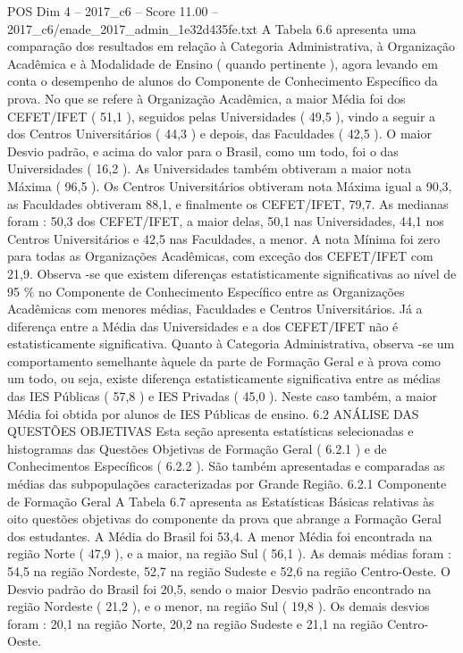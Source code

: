 \begin{textsample}{POS Dim 4 – 2017\_c6 – Score 11.00 – 2017\_c6/enade\_2017\_admin\_1e32d435fe.txt}
A Tabela 6.6 apresenta uma comparação dos resultados em relação à Categoria Administrativa, à Organização Acadêmica e à Modalidade de Ensino ( quando pertinente ), agora levando em conta o desempenho de alunos do Componente de Conhecimento Específico da prova.
No que se refere à Organização Acadêmica, a maior Média foi dos CEFET/IFET ( 51,1 ), seguidos pelas Universidades ( 49,5 ), vindo a seguir a dos Centros Universitários ( 44,3 ) e depois, das Faculdades ( 42,5 ).
O maior Desvio padrão, e acima do valor para o Brasil, como um todo, foi o das Universidades ( 16,2 ).
As Universidades também obtiveram a maior nota Máxima ( 96,5 ).
Os Centros Universitários obtiveram nota Máxima igual a 90,3, as Faculdades obtiveram 88,1, e finalmente os CEFET/IFET, 79,7.
As medianas foram : 50,3 dos CEFET/IFET, a maior delas, 50,1 nas Universidades, 44,1 nos Centros Universitários e 42,5 nas Faculdades, a menor.
A nota Mínima foi zero para todas as Organizações Acadêmicas, com exceção dos CEFET/IFET com 21,9.
Observa -se que existem diferenças estatisticamente significativas ao nível de 95 \% no Componente de Conhecimento Específico entre as Organizações Acadêmicas com menores médias, Faculdades e Centros Universitários.
Já a diferença entre a Média das Universidades e a dos CEFET/IFET não é estatisticamente significativa.
Quanto à Categoria Administrativa, observa -se um comportamento semelhante àquele da parte de Formação Geral e à prova como um todo, ou seja, existe diferença estatisticamente significativa entre as médias das IES Públicas ( 57,8 ) e IES Privadas ( 45,0 ).
Neste caso também, a maior Média foi obtida por alunos de IES Públicas de ensino. 6.2 ANÁLISE DAS QUESTÕES OBJETIVAS Esta seção apresenta estatísticas selecionadas e histogramas das Questões Objetivas de Formação Geral ( 6.2.1 ) e de Conhecimentos Específicos ( 6.2.2 ).
São também apresentadas e comparadas as médias das subpopulações caracterizadas por Grande Região. 6.2.1 Componente de Formação Geral A Tabela 6.7 apresenta as Estatísticas Básicas relativas às oito questões objetivas do componente da prova que abrange a Formação Geral dos estudantes.
A Média do Brasil foi 53,4.
A menor Média foi encontrada na região Norte ( 47,9 ), e a maior, na região Sul ( 56,1 ).
As demais médias foram : 54,5 na região Nordeste, 52,7 na região Sudeste e 52,6 na região Centro-Oeste.
O Desvio padrão do Brasil foi 20,5, sendo o maior Desvio padrão encontrado na região Nordeste ( 21,2 ), e o menor, na região Sul ( 19,8 ).
Os demais desvios foram : 20,1 na região Norte, 20,2 na região Sudeste e 21,1 na região Centro-Oeste.

\end{textsample}
